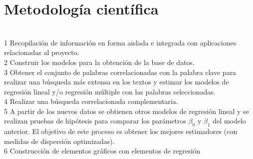 \section {Metodología científica}
\ \\
1 Recopilación de información en forma aislada e integrada con aplicaciones relacionadas al proyecto.\\
2 Construir los modelos para la obtención de la base de datos.\\
3 Obtener el conjunto de palabras correlacionadas con la palabra clave para realizar una búsqueda más extensa en los textos y estimar los modelos de regresión lineal y/o regresión múltiple con las palabras seleccionadas.\\
4 Realizar una búsqueda correlacionada complementaria.\\
5 A partir de los nuevos datos se obtienen otros modelos de regresión lineal y se realizan pruebas de hipótesis para comparar los parámetros $\beta_0$ y $\beta_1$ del modelo anterior. El objetivo de este proceso es obtener los mejores estimadores (con medidas de dispersión optimizadas).\\
6 Construcción de elementos gráficos con elementos de regresión